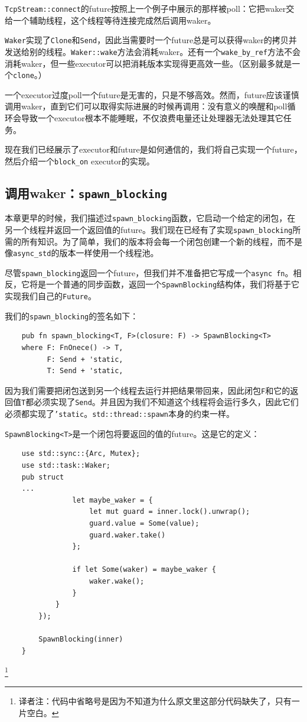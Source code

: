 \texttt{TcpStream::connect}的future按照上一个例子中展示的那样被poll：它把waker交给一个辅助线程，这个线程等待连接完成然后调用waker。

\texttt{Waker}实现了\texttt{Clone}和\texttt{Send}，因此当需要时一个future总是可以获得waker的拷贝并发送给别的线程。\texttt{Waker::wake}方法会消耗waker。还有一个\texttt{wake\_by\_ref}方法不会消耗waker，但一些executor可以把消耗版本实现得更高效一些。（区别最多就是一个\texttt{clone}。）

一个executor过度poll一个future是无害的，只是不够高效。然而，future应该谨慎调用waker，直到它们可以取得实际进展的时候再调用：没有意义的唤醒和poll循环会导致一个executor根本不能睡眠，不仅浪费电量还让处理器无法处理其它任务。

现在我们已经展示了executor和future是如何通信的，我们将自己实现一个future，然后介绍一个\texttt{block\_on} executor的实现。

\subsection{调用waker：\texttt{spawn\_blocking}}\label{InvokeWaker}
本章更早的时候，我们描述过\texttt{spawn\_blocking}函数，它启动一个给定的闭包，在另一个线程并返回一个返回值的future。我们现在已经有了实现\texttt{spawn\_blocking}所需的所有知识。为了简单，我们的版本将会每一个闭包创建一个新的线程，而不是像\texttt{async\_std}的版本一样使用一个线程池。

尽管\texttt{spawn\_blocking}返回一个future，但我们并不准备把它写成一个\texttt{async fn}。相反，它将是一个普通的同步函数，返回一个\texttt{SpawnBlocking}结构体，我们将基于它实现我们自己的\texttt{Future}。

我们的\texttt{spawn\_blocking}的签名如下：
\begin{verbatim}
    pub fn spawn_blocking<T, F>(closure: F) -> SpawnBlocking<T>
    where F: FnOnece() -> T,
          F: Send + 'static,
          T: Send + 'static,
\end{verbatim}

因为我们需要把闭包送到另一个线程去运行并把结果带回来，因此闭包\texttt{F}和它的返回值\texttt{T}都必须实现了\texttt{Send}。并且因为我们不知道这个线程将会运行多久，因此它们必须都实现了\texttt{'static}。\texttt{std::thread::spawn}本身的约束一样。

\texttt{SpawnBlocking<T>}是一个闭包将要返回的值的future。这是它的定义：
\begin{verbatim}
    use std::sync::{Arc, Mutex};
    use std::task::Waker;
    pub struct
    ...
                let maybe_waker = {
                    let mut guard = inner.lock().unwrap();
                    guard.value = Some(value);
                    guard.waker.take()
                };

                if let Some(waker) = maybe_waker {
                    waker.wake();
                }
            }
        });

        SpawnBlocking(inner)
    }
\end{verbatim}
\footnote{译者注：代码中省略号是因为不知道为什么原文里这部分代码缺失了，只有一片空白。}

